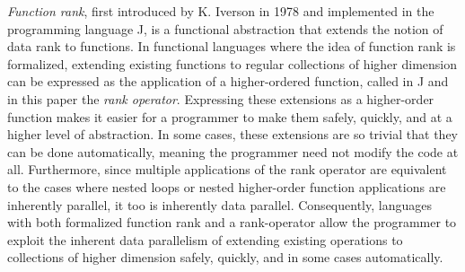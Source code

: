 \textit{Function rank}, first introduced by K. Iverson in 1978\cite{opandfunc} %
and implemented in the programming language J, 
is a functional abstraction that extends the notion of data rank to functions. 
In functional languages where the idea of function rank is formalized, 
extending existing functions to regular collections of higher dimension 
can be expressed as the application of a higher-ordered function, 
called in J and in this paper the \textit{rank operator}. \cite{jvocab} %
Expressing these extensions as a higher-order function 
makes it easier for a programmer to make them %
safely, %
quickly, and at a higher level of abstraction.
In some cases, these extensions are so trivial that they can be done automatically,\cite{jvocab} \cite{rankanduni} 
meaning the programmer need not modify the code at all. 
Furthermore, since multiple applications of the rank operator 
are equivalent to the cases where nested loops or nested higher-order function applications are inherently parallel, 
it too is inherently data parallel.
Consequently, languages with both formalized function rank and a rank-operator allow the programmer to 
exploit the inherent data parallelism of extending existing operations to collections of higher dimension 
safely, quickly, and in some cases automatically.

